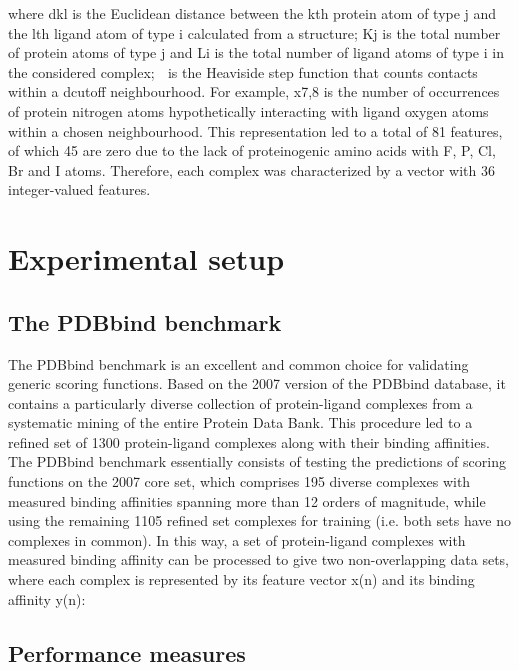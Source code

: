 \documentclass{llncs}
\begin{document}

where dkl is the Euclidean distance between the kth protein atom of type j and the lth ligand atom of type i calculated from a structure; Kj is the total number of protein atoms of type j and Li is the total number of ligand atoms of type i in the considered complex;  is the Heaviside step function that counts contacts within a dcutoff neighbourhood. For example, x7,8 is the number of occurrences of protein nitrogen atoms hypothetically interacting with ligand oxygen atoms within a chosen neighbourhood. This representation led to a total of 81 features, of which 45 are zero due to the lack of proteinogenic amino acids with F, P, Cl, Br and I atoms. Therefore, each complex was characterized by a vector with 36 integer-valued features.

\section{Experimental setup}

\subsection{The PDBbind benchmark}


The PDBbind benchmark \cite{1313} is an excellent and common choice for validating generic scoring functions. Based on the 2007 version of the PDBbind database, it contains a particularly diverse collection of protein-ligand complexes from a systematic mining of the entire Protein Data Bank. This procedure led to a refined set of 1300 protein-ligand complexes along with their binding affinities. The PDBbind benchmark essentially consists of testing the predictions of scoring functions on the 2007 core set, which comprises 195 diverse complexes with measured binding affinities spanning more than 12 orders of magnitude, while using the remaining 1105 refined set complexes for training (i.e. both sets have no complexes in common). In this way, a set of protein-ligand complexes with measured binding affinity can be processed to give two non-overlapping data sets, where each complex is represented by its feature vector x(n) and its binding affinity y(n):


\subsection{Performance measures}
\end{document}
